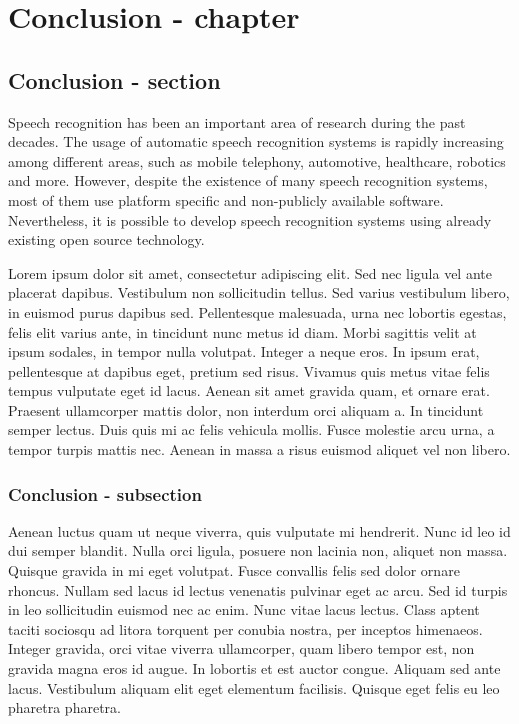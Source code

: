 \chapter{Conclusion - chapter}
\section{Conclusion - section}
Speech recognition has been an important area of research during the past
decades.  The usage of automatic speech recognition systems is rapidly
increasing among different areas, such as mobile telephony, automotive,
healthcare, robotics and more. However, despite the existence of many speech
recognition systems, most of them use platform specific and non-publicly
available software. Nevertheless, it is possible to develop speech recognition
systems using already existing open source technology.

Lorem ipsum dolor sit amet, consectetur adipiscing elit. Sed nec ligula vel
ante placerat dapibus. Vestibulum non sollicitudin tellus. Sed varius
vestibulum libero, in euismod purus dapibus sed. Pellentesque malesuada, urna
nec lobortis egestas, felis elit varius ante, in tincidunt nunc metus id diam.
Morbi sagittis velit at ipsum sodales, in tempor nulla volutpat. Integer a
neque eros. In ipsum erat, pellentesque at dapibus eget, pretium sed risus.
Vivamus quis metus vitae felis tempus vulputate eget id lacus. Aenean sit amet
gravida quam, et ornare erat. Praesent ullamcorper mattis dolor, non interdum
orci aliquam a. In tincidunt semper lectus. Duis quis mi ac felis vehicula
mollis. Fusce molestie arcu urna, a tempor turpis mattis nec. Aenean in massa a
risus euismod aliquet vel non libero.

\subsection{Conclusion - subsection}
Aenean luctus quam ut neque viverra, quis vulputate mi hendrerit. Nunc id leo
id dui semper blandit. Nulla orci ligula, posuere non lacinia non, aliquet non
massa. Quisque gravida in mi eget volutpat. Fusce convallis felis sed dolor
ornare rhoncus. Nullam sed lacus id lectus venenatis pulvinar eget ac arcu. Sed
id turpis in leo sollicitudin euismod nec ac enim. Nunc vitae lacus lectus.
Class aptent taciti sociosqu ad litora torquent per conubia nostra, per
inceptos himenaeos. Integer gravida, orci vitae viverra ullamcorper, quam
libero tempor est, non gravida magna eros id augue. In lobortis et est auctor
congue. Aliquam sed ante lacus. Vestibulum aliquam elit eget elementum
facilisis. Quisque eget felis eu leo pharetra pharetra.

